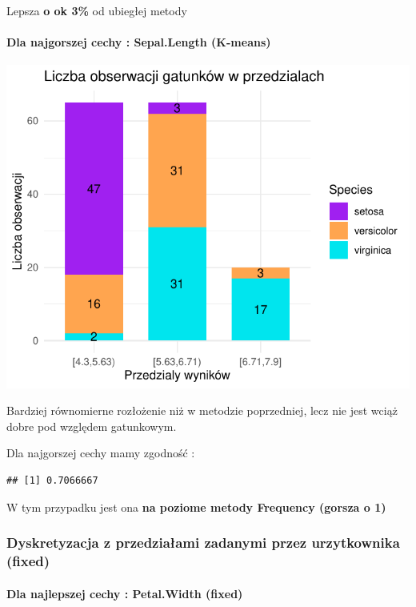 \documentclass[
  12pt,
]{article}
\begin{document}
Lepsza \textbf{o ok 3\%} od ubiegłej metody

\paragraph{Dla najgorszej cechy : Sepal.Length
(K-means)}\label{dla-najgorszej-cechy-sepal.length-k-means}

\begin{center}\includegraphics{Sprawozdanie2_files/figure-latex/tabela_kondygnacji_3_najg-1} \end{center}

Bardziej równomierne rozłożenie niż w metodzie poprzedniej, lecz nie
jest wciąż dobre pod względem gatunkowym.

Dla najgorszej cechy mamy zgodność :

\begin{verbatim}
## [1] 0.7066667
\end{verbatim}

W tym przypadku jest ona \textbf{na poziome metody Frequency (gorsza o
1)}

\subsubsection{Dyskretyzacja z przedziałami zadanymi przez urzytkownika
(fixed)}\label{dyskretyzacja-z-przedziaux142ami-zadanymi-przez-urzytkownika-fixed}

\paragraph{Dla najlepszej cechy : Petal.Width
(fixed)}\label{dla-najlepszej-cechy-petal.width-fixed}
\end{document}
